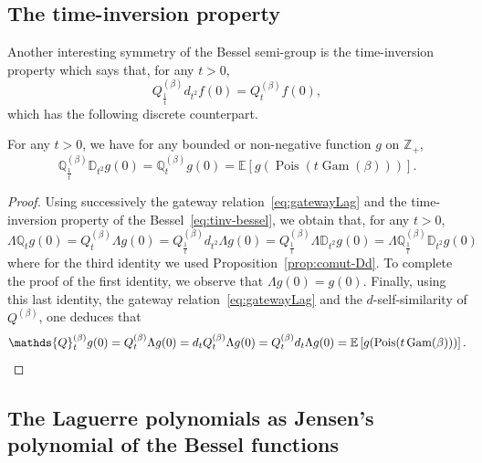 \documentclass[AHL,Unicode,longabstracts]{cedram}
\DeclareMathOperator{\Pois}{Pois}
\DeclareMathOperator{\Gam}{Gam}
\newcommand{\ZZ}{\mathbb{Z}}
\newcommand*\E{{\mathbb E}}
\newcommand{\discret}[1]{\mathds{#1}}
\newcommand{\cont}[1]{{#1}}
\begin{document}
\subsection{The time-inversion property} Another interesting symmetry of the Bessel semi-group is the time-inversion property which says that, for any $t>0$,
\begin{equation}\label{eq:tinv-bessel}
\cont{Q}^{(\beta)}_{\frac{1}{t}}\cont{d}_{t^2}f(0)=\cont{Q}^{(\beta)}_tf(0),
\end{equation}
which has the following discrete counterpart.

\begin{prop}\label{prop:tiv}
For any $t>0$, we have for any bounded or non-negative function $g$ on $\ZZ_+$,
\begin{equation*}
\discret{Q}^{(\beta)}_{\frac{1}{t}}\discret{D}_{t^2}g(0)=\discret{Q}^{(\beta)}_tg(0)=\E[g(\Pois(t\Gam(\beta)))].
\end{equation*}
\end{prop}
\begin{proof}
Using successively the gateway relation~\eqref{eq:gatewayLag} and the time-inversion property of the Bessel~\eqref{eq:tinv-bessel}, we obtain that, for any $t>0$,
\[
\Lambda \discret{Q}_t g(0) =\cont{Q}^{(\beta)}_t \Lambda g(0) =\cont{Q}^{(\beta)}_{\frac{1}{t}}\cont{d}_{t^2}\Lambda g(0)=\cont{Q}^{(\beta)}_{\frac{1}{t}}\Lambda \discret{D}_{t^2}g(0)=\Lambda\discret{Q}^{(\beta)}_{\frac{1}{t}} \discret{D}_{t^2}g(0)
\]
where for the third identity we used Proposition~\ref{prop:comut-Dd}. To complete the proof of the first identity, we observe that $\Lambda g(0)=g(0)$. Finally, using this last identity, the gateway relation~\eqref{eq:gatewayLag} and the $d$-self-similarity of $Q^{(\beta)}$, one deduces that
\[
\discret{Q}^{(\beta)}_tg(0)= Q^{(\beta)}_t \Lambda g(0)= \cont{d}_t Q^{(\beta)}_t \Lambda g(0) = Q^{(\beta)}_t \cont{d}_t\Lambda g(0) =\E\left[g(\Pois(t\Gam(\beta)))\right].\qedhere
\]
\end{proof}

\subsection{The Laguerre polynomials as Jensen's polynomial of the Bessel functions}
\end{document}
